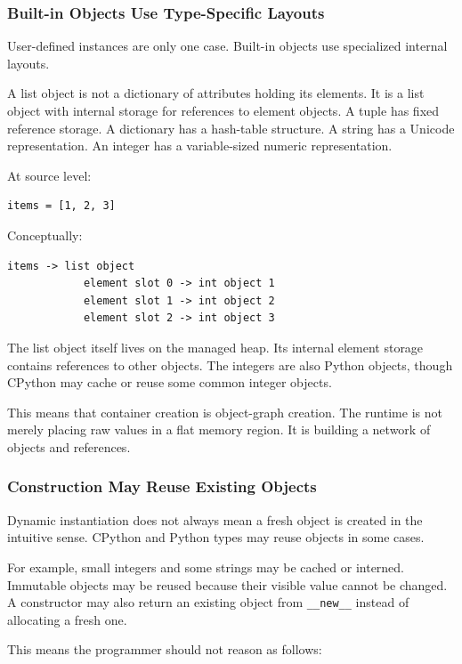 \subsubsection*{Built-in Objects Use Type-Specific Layouts}

User-defined instances are only one case. Built-in objects use specialized internal layouts.

A list object is not a dictionary of attributes holding its elements. It is a list object with internal storage for references to element objects. A tuple has fixed reference storage. A dictionary has a hash-table structure. A string has a Unicode representation. An integer has a variable-sized numeric representation.

At source level:

\begin{verbatim}
items = [1, 2, 3]
\end{verbatim}

Conceptually:

\begin{verbatim}
items -> list object
            element slot 0 -> int object 1
            element slot 1 -> int object 2
            element slot 2 -> int object 3
\end{verbatim}

The list object itself lives on the managed heap. Its internal element storage contains references to other objects. The integers are also Python objects, though CPython may cache or reuse some common integer objects.

This means that container creation is object-graph creation. The runtime is not merely placing raw values in a flat memory region. It is building a network of objects and references.

\subsubsection*{Construction May Reuse Existing Objects}

Dynamic instantiation does not always mean a fresh object is created in the intuitive sense. CPython and Python types may reuse objects in some cases.

For example, small integers and some strings may be cached or interned. Immutable objects may be reused because their visible value cannot be changed. A constructor may also return an existing object from \texttt{\_\_new\_\_} instead of allocating a fresh one.

This means the programmer should not reason as follows:

